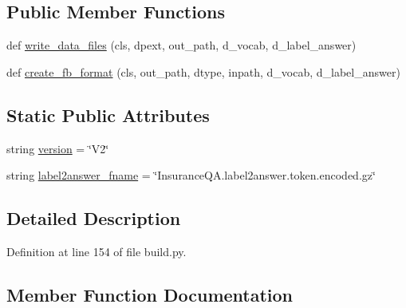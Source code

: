 \subsection*{Public Member Functions}
\begin{DoxyCompactItemize}
\item 
def \hyperlink{classparlai_1_1tasks_1_1insuranceqa_1_1build_1_1ParseInsuranceQAV2_a8a510d31a4f0b733beb887de3c8379b0}{write\+\_\+data\+\_\+files} (cls, dpext, out\+\_\+path, d\+\_\+vocab, d\+\_\+label\+\_\+answer)
\item 
def \hyperlink{classparlai_1_1tasks_1_1insuranceqa_1_1build_1_1ParseInsuranceQAV2_abaa749229881633590c411cdaf79c6ff}{create\+\_\+fb\+\_\+format} (cls, out\+\_\+path, dtype, inpath, d\+\_\+vocab, d\+\_\+label\+\_\+answer)
\end{DoxyCompactItemize}
\subsection*{Static Public Attributes}
\begin{DoxyCompactItemize}
\item 
string \hyperlink{classparlai_1_1tasks_1_1insuranceqa_1_1build_1_1ParseInsuranceQAV2_a3e6db8ab79db9655ff077b13b84d1c1b}{version} = \char`\"{}V2\char`\"{}
\item 
string \hyperlink{classparlai_1_1tasks_1_1insuranceqa_1_1build_1_1ParseInsuranceQAV2_a60ef361268188ec13f71fc9a436d3d7d}{label2answer\+\_\+fname} = \char`\"{}Insurance\+Q\+A.\+label2answer.\+token.\+encoded.\+gz\char`\"{}
\end{DoxyCompactItemize}


\subsection{Detailed Description}


Definition at line 154 of file build.\+py.



\subsection{Member Function Documentation}
\mbox{\label{classparlai_1_1tasks_1_1insuranceqa_1_1build_1_1ParseInsuranceQAV2_abaa749229881633590c411cdaf79c6ff}} 
